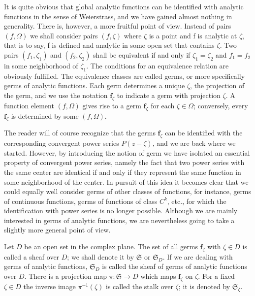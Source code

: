 It is quite obvious that global analytic functions can be identified with analytic functions in the sense of Weierstrass, and we have gained almost nothing in generality. There is, however, a more fruitful point of view. Instead of pairs $(f,\Omega)$ we shall consider pairs $(f,\zeta)$ where $\zeta$ is a point and f is analytic at $\zeta$, that is to say, f is defined and analytic in some open set that contains $\zeta$. Two pairs $(f_{1},\zeta_{1})$ and $(f_{2},\zeta_{2})$ shall be equivalent if and only if $\zeta_{1} = \zeta_{2}$ and $f_{1} = f_{2}$ in some neighborhood of $\zeta_{1}$. The conditions for an equivalence relation are obviously fulfilled. The equivalence classes are called germs, or more specifically germs of analytic functions. Each germ determines a unique $\zeta$, the projection of the germ, and we use the notation $\mathbf{f}_{\zeta}$ to indicate a germ with projection $\zeta$. A function element $(f,\Omega)$ gives rise to a germ $\mathbf{f}_{\zeta}$ for each $\zeta \in \Omega$; conversely, every $\mathbf{f}_{\zeta}$ is determined by some $(f,\Omega)$.

The reader will of course recognize that the germs $\mathbf{f}_{\zeta}$ can be identified with the corresponding convergent power series $P(z - \zeta)$, and we are back where we started. However, by introducing the notion of germ we have isolated an essential property of convergent power series, namely the fact that two power series with the same center are identical if and only if they represent the same function in some neighborhood of the center. In pursuit of this idea it becomes clear that we could equally well consider germs of other classes of functions, for instance, germs of continuous functions, germs of functions of class $C^{k}$, etc., for which the identification with power series is no longer possible. Although we are mainly interested in
germs of analytic functions, we are nevertheless going to take a slightly more general point of view.

Let $D$ be an open set in the complex plane. The set of all germs $\mathbf{f}_{\zeta}$ with $\zeta \in D$ is called a sheaf over $D$; we shall denote it by $\mathfrak{S}$ or $\mathfrak{S}_D$. If we are dealing with germs of analytic functions, $\mathfrak{S}_D$ is called the sheaf of germs of analytic functions over $D$. There is a projection map $\pi: \mathfrak{S} \to D$ which maps $\mathbf{f}_{\zeta}$ on $\zeta$. For a fixed $\zeta \in D$ the inverse image $\pi^{-1}(\zeta)$ is called the stalk over $\zeta$; it is denoted by $\mathfrak{S}_{\zeta}$.

